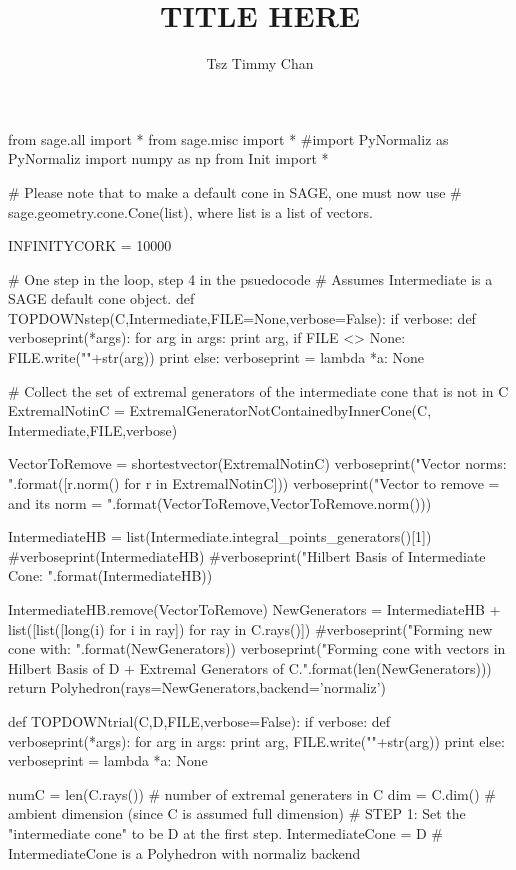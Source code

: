 \documentclass{TC}
\title{TITLE HERE}	%
\author{Tsz Timmy Chan}	%
\begin{document}
\begin{SAGE}
from sage.all import *
from sage.misc import *
#import PyNormaliz as PyNormaliz
import numpy as np
from Init import *

# Please note that to make a default cone in SAGE, one must now use 
# sage.geometry.cone.Cone(list), where list is a list of vectors.



INFINITYCORK = 10000




# One step in the loop, step 4 in the psuedocode 
# Assumes Intermediate is a SAGE default cone object.
def TOPDOWNstep(C,Intermediate,FILE=None,verbose=False):
	if verbose:
		def verboseprint(*args):
			for arg in args:
				print arg,
				if FILE <> None:
					FILE.write("\n"+str(arg))
			print
	else:
		verboseprint = lambda *a: None 

	# Collect the set of extremal generators of the intermediate cone that is not in C
	ExtremalNotinC = ExtremalGeneratorNotContainedbyInnerCone(C, Intermediate,FILE,verbose)

	
	VectorToRemove = shortestvector(ExtremalNotinC)
	verboseprint("Vector norms: {}".format([r.norm() for r in ExtremalNotinC]))
	verboseprint("Vector to remove = {} and its norm = {}".format(VectorToRemove,VectorToRemove.norm()))

	IntermediateHB = list(Intermediate.integral_points_generators()[1])
	#verboseprint(IntermediateHB)
	#verboseprint("Hilbert Basis of Intermediate Cone: \n {}".format(IntermediateHB))

	IntermediateHB.remove(VectorToRemove)
	NewGenerators = IntermediateHB + list([list([long(i) for i in ray]) for ray in C.rays()])
	#verboseprint("Forming new cone with: \n{}".format(NewGenerators))
	verboseprint("Forming cone with {} vectors in Hilbert Basis of D + Extremal Generators of C.".format(len(NewGenerators)))
	return Polyhedron(rays=NewGenerators,backend='normaliz')
	


def TOPDOWNtrial(C,D,FILE,verbose=False):
	if verbose:
		def verboseprint(*args):
			for arg in args:
			   print arg,
			   FILE.write("\n"+str(arg))
			print
	else:
		verboseprint = lambda *a: None 
	
	numC = len(C.rays()) 	# number of extremal generaters in C
	dim = C.dim()			# ambient dimension (since C is assumed full dimension)
	# STEP 1: Set the "intermediate cone" to be D at the first step.
	IntermediateCone = D # IntermediateCone is a Polyhedron with normaliz backend



\end{SAGE}
\end{document}
